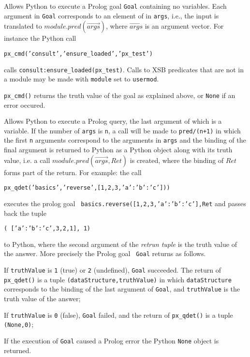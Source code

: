 \begin{description}

%
  Allows Python to execute a Prolog goal {\tt Goal} containing no
  variables.  Each argument in {\tt Goal} corresponds to an element of
  in {\tt args}, i.e., the input is translated to
  $module.pred(\vec{args})$, where $\vec{args}$ is an argument vector.
  For instance the Python call

  {\tt px\_cmd('consult','ensure\_loaded','px\_test')}

  calls {\tt consult:ensure\_loaded(px\_test)}.  Calls to XSB
  predicates that are not in a module may be made with {\tt module}
  set to {\tt usermod}.

  {\tt px\_cmd()} returns the truth value of the goal as explained
  above, or {\tt None} if an error occured.
  
%
  Allows Python to execute a Prolog query, the last argument of which
  is a variable.  If the number of {\tt args} is {\tt n}, a call will
  be made to {\tt pred/(n+1)} in which the first {\tt n} arguments
  correspond to the arguments in {\tt args} and the binding of the 
  final argument is returned to Python as a Python object along with
  its truth value, i.e. a call $module.pred(\vec{args},Ret)$ is
  created, where the binding of $Ret$ forms part of the return.  For
  example: the call

  {\tt px\_qdet('basics','reverse',[1,2,3,{'a':{'b':'c'}}]))}

  \noindent
  executes the prolog goal {\tt
    basics.reverse([1,2,3,{'a':{'b':'c'}}],Ret} and passes back the tuple

  {\tt ( [{'a':{'b':'c'}},3,2,1], 1)}

  \noindent
  to Python, where the second argument of the {\em retrun tuple} is
  the truth value of the answer.  More precisely the Prolog goal {\tt
    Goal} returns as follows.

  \bi
  \item If {\tt truthValue} is {\tt 1} (true) or {\tt 2} (undefined),
    {\tt Goal} succeeded.  The return of {\tt px\_qdet()} is a tuple
    {\tt (dataStructure,truthValue)} in which {\tt dataStructure}
    corresponds to the binding of the last argument of {\tt Goal}, and
    {\tt truthValue} is the truth value of the answer;
   \item If {\tt truthValue} is {\tt 0} (false), {\tt Goal} failed,
     and the return of {\tt px\_qdet()} is a tuple {\tt (None,0)};
   \item If the execution of {\tt Goal} caused a Prolog error the
     Python {\tt None} object is returned.
     \ei


\end{description}
